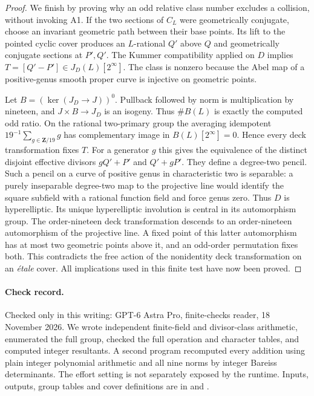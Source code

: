 \begin{proof}
We finish by proving why an odd relative class number excludes a
collision, without invoking A1. If the two sections of $C_L$ were
geometrically conjugate, choose an invariant geometric path between
their base points. Its lift to the pointed cyclic cover produces an
$L$-rational $Q'$ above $Q$ and geometrically conjugate sections at
$P',Q'$. The Kummer compatibility applied on $D$ implies
$T=[Q'-P']\in J_D(L)[2^\infty]$. The class is nonzero because the
Abel map of a positive-genus smooth proper curve is injective on
geometric points.

Let $B=(\ker(J_D\to J))^0$. Pullback followed by norm is
multiplication by nineteen, and $J\times B\to J_D$ is an isogeny.
Thus $\#B(L)$ is exactly the computed odd ratio. On the rational
two-primary group the averaging idempotent
$19^{-1}\sum_{g\in\mathbf Z/19}g$ has complementary image in
$B(L)[2^\infty]=0$. Hence every deck transformation fixes $T$.
For a generator $g$ this gives the equivalence of the distinct disjoint
effective divisors $gQ'+P'$ and $Q'+gP'$. They define a degree-two
pencil. Such a pencil on a curve of positive genus in characteristic
two is separable: a purely inseparable degree-two map to the projective
line would identify the square subfield with a rational function
field and force genus zero. Thus $D$ is hyperelliptic. Its unique
hyperelliptic involution is central in its automorphism group. The
order-nineteen deck transformation descends to an order-nineteen
automorphism of the projective line. A fixed point of this latter
automorphism has at most two geometric points above it, and an
odd-order permutation fixes both. This contradicts the free action
of the nonidentity deck transformation on an \emph{\'etale} cover.
All implications used in this finite test have now been proved.
\end{proof}

\paragraph{Check record.}
Checked only in this writing: GPT-6 Astra Pro, finite-checks reader,
18 November 2026. We wrote independent finite-field and divisor-class
arithmetic, enumerated the full group, checked the full operation and
character tables, and computed integer resultants. A second program
recomputed every addition using plain integer polynomial arithmetic
and all nine norms by integer Bareiss determinants. The effort setting
is not separately exposed by the runtime. Inputs, outputs, group
tables and cover definitions are in
 and .

